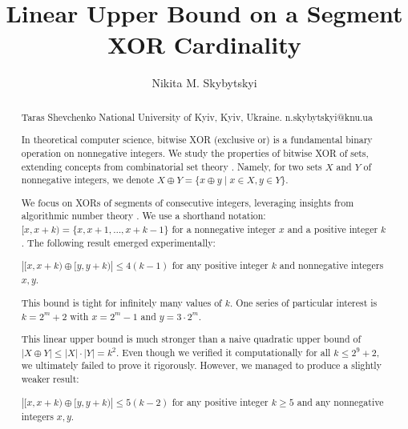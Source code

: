 \documentclass[ascii]{abook}
\begin{document}
\begin{abstract}


\title{Linear Upper Bound on a Segment XOR Cardinality}

\author[N.~Skybytskyi]{Nikita M. Skybytskyi}
{Taras Shevchenko National University of Kyiv, Kyiv, Ukraine.}
{n.skybytskyi@knu.ua}

\maketitle

In theoretical computer science, bitwise XOR (exclusive or) is a fundamental binary operation on nonnegative integers. We study the properties of bitwise XOR of sets, extending concepts from combinatorial set theory \cite{skybytskyi:stanley_enumerative}. Namely, for two sets $X$ and $Y$ of nonnegative integers, we denote $X \oplus Y = \{x \oplus y \mid x \in X, y \in Y\}$.

We focus on XORs of segments of consecutive integers, leveraging insights from algorithmic number theory \cite{skybytskyi:bach_algorithmic}. We use a shorthand notation: $[x, x+k) = \{x, x+1, \dots, x+k-1\}$ for a nonnegative integer $x$ and a positive integer $k$. The following result emerged experimentally:

\begin{conjecture*}
    $|[x, x+k) \oplus [y, y+k)| \le 4(k-1)$ for any positive integer $k$ and nonnegative integers $x, y$.
\end{conjecture*}

\begin{remark*}
    This bound is tight for infinitely many values of $k$. One series of particular interest is $k = 2^m + 2$ with $x = 2^m - 1$ and $y = 3 \cdot 2^m$.
\end{remark*}

This linear upper bound is much stronger than a naive quadratic upper bound of $|X \oplus Y| \le |X| \cdot |Y| = k^2$. Even though we verified it computationally for all $k \le 2^9 + 2$, we ultimately failed to prove it rigorously. However, we managed to produce a slightly weaker result:

\begin{theorem*}
    $|[x, x+k) \oplus [y, y+k)| \le 5(k-2)$ for any positive integer $k \ge 5$ and any nonnegative integers $x, y$.
\end{theorem*}


\end{abstract}
\end{document}
